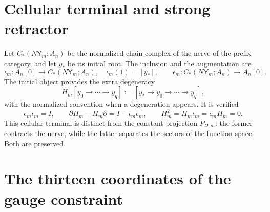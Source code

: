 \section{Cellular terminal and strong retractor}

Let \(C_*(N\mathsf Y_m;A_n)\) be the normalized chain complex of the nerve of the
prefix category, and let \(y_*\) be its initial root. The inclusion and the
augmentation are
\[
 \iota_m:A_n[0]\longrightarrow C_*(N\mathsf Y_m;A_n),
 \quad \iota_m(1)=[y_*],
 \qquad
 \epsilon_m:C_*(N\mathsf Y_m;A_n)\longrightarrow A_n[0].
\]
The initial object provides the extra degeneracy
\begin{equation}\label{eq:gauint-homotopia-celular}
 H_m[y_0\to\cdots\to y_q]
 :=[y_*\to y_0\to\cdots\to y_q],
\end{equation}
with the normalized convention when a degeneration appears. It is verified
\begin{equation}\label{eq:gauint-sdr}
 \epsilon_m\iota_m=I,
 \qquad
 \partial H_m+H_m\partial=I-\iota_m\epsilon_m,
 \qquad
 H_m^2=H_m\iota_m=\epsilon_mH_m=0.
\end{equation}
This cellular terminal is distinct from the constant projection
\(P_{\Omega,m}\): the former contracts the nerve, while the latter separates the
sectors of the function space. Both are preserved.

\iffalse
\section{The thirteen coordinates of the gauge constraint}

